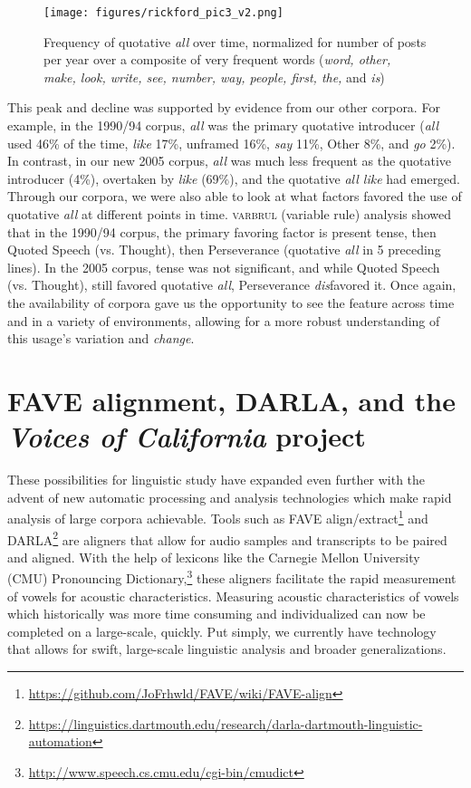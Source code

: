 \documentclass[output=paper,colorlinks,citecolor=brown]{langscibook}
\begin{document}
 
\begin{figure}
\texttt{[image: figures/rickford\_pic3\_v2.png]}
\caption{Frequency of quotative \textit{all} over time, normalized for number of posts per year over a composite of very frequent words (\textit{word, other, make, look, write, see, number, way, people, first, the,} and \textit{is})}
\label{fig:rickford:2}
\end{figure}


This peak and decline was supported by evidence from our other corpora. For example, in the 1990/94 corpus, \textit{all} was the primary quotative introducer (\textit{all} used 46\% of the time, \textit{like} 17\%, unframed 16\%, \textit{say} 11\%, Other 8\%, and \textit{go} 2\%). In contrast, in our new 2005 corpus, \textit{all} was much less frequent as the quotative introducer (4\%), overtaken by \textit{like} (69\%), and the quotative \textit{all like} had emerged. Through our corpora, we were also able to look at what factors favored the use of quotative \textit{all} at different points in time. \textsc{varbrul} (variable rule) analysis showed that in the 1990/94 corpus, the primary favoring factor is present tense, then Quoted Speech (vs. Thought), then Perseverance (quotative \textit{all} in 5 preceding lines). In the 2005 corpus, tense was not significant, and while Quoted Speech (vs. Thought), still favored quotative \textit{all}, Perseverance \textit{dis}favored it. Once again, the availability of corpora gave us the opportunity to see the feature across time and in a variety of environments, allowing for a more robust understanding of this usage’s variation and \textit{change}.


\section{FAVE alignment, DARLA, and the \textit{Voices of California} project}
\begin{sloppypar}
These possibilities for linguistic study have expanded even further with the advent of new automatic processing and analysis technologies which make rapid analysis of large corpora achievable. Tools such as FAVE align/extract\footnote{\url{https://github.com/JoFrhwld/FAVE/wiki/FAVE-align}} and DARLA\footnote{\url{https://linguistics.dartmouth.edu/research/darla-dartmouth-linguistic-automation}} are aligners that allow for audio samples and transcripts to be paired and aligned.  With the help of lexicons like the Carnegie Mellon University (CMU) Pronouncing Dictionary,\footnote{\url{http://www.speech.cs.cmu.edu/cgi-bin/cmudict}} these aligners facilitate the rapid measurement of vowels for acoustic characteristics. Measuring acoustic characteristics of vowels which historically was more time consuming and individualized can now be completed on a large-scale, quickly. Put simply, we currently have technology that allows for swift, large-scale linguistic analysis and broader generalizations.
\end{sloppypar} 
\end{document}
